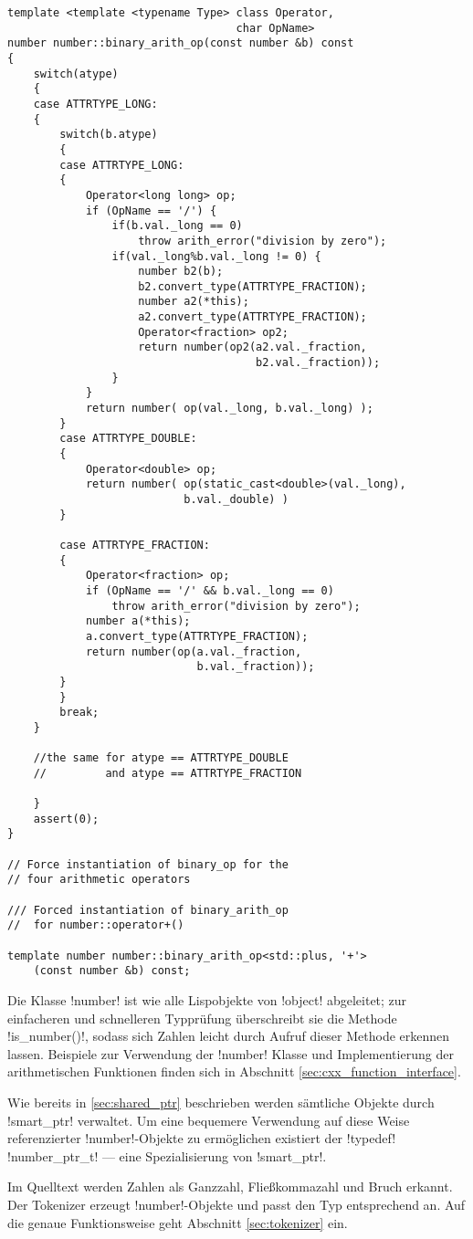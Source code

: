 \begin{lstlisting}[caption={Arithmetische Operatoren}, label=lst:op_template]
template <template <typename Type> class Operator,
                                   char OpName>
number number::binary_arith_op(const number &b) const
{
    switch(atype)
    {
    case ATTRTYPE_LONG:
    {
        switch(b.atype)
        {
        case ATTRTYPE_LONG:
        {
            Operator<long long> op;
            if (OpName == '/') {
                if(b.val._long == 0)
                    throw arith_error("division by zero");
                if(val._long%b.val._long != 0) {
                    number b2(b);
                    b2.convert_type(ATTRTYPE_FRACTION);
                    number a2(*this);
                    a2.convert_type(ATTRTYPE_FRACTION);
                    Operator<fraction> op2;
                    return number(op2(a2.val._fraction,
                                      b2.val._fraction));
                }
            }
            return number( op(val._long, b.val._long) );
        }
        case ATTRTYPE_DOUBLE:
        {
            Operator<double> op;
            return number( op(static_cast<double>(val._long),
                           b.val._double) )
        }

        case ATTRTYPE_FRACTION:
        {
            Operator<fraction> op;
            if (OpName == '/' && b.val._long == 0)
                throw arith_error("division by zero");
            number a(*this);
            a.convert_type(ATTRTYPE_FRACTION);
            return number(op(a.val._fraction,
                             b.val._fraction));
        }
        }
        break;
    }

    //the same for atype == ATTRTYPE_DOUBLE
    //         and atype == ATTRTYPE_FRACTION

    }
    assert(0);
}

// Force instantiation of binary_op for the
// four arithmetic operators

/// Forced instantiation of binary_arith_op
//  for number::operator+()

template number number::binary_arith_op<std::plus, '+'>
    (const number &b) const;
\end{lstlisting}

Die Klasse !number! ist wie alle Lispobjekte von !object! abgeleitet; zur einfacheren und schnelleren Typprüfung überschreibt sie die Methode !is_number()!, sodass sich Zahlen leicht durch Aufruf dieser Methode erkennen lassen. Beispiele zur Verwendung der !number! Klasse und Implementierung der arithmetischen Funktionen finden sich in Abschnitt \ref{sec:cxx_function_interface}.

Wie bereits in \ref{sec:shared_ptr} beschrieben werden sämtliche Objekte durch !smart_ptr! verwaltet. Um eine bequemere Verwendung auf diese Weise referenzierter !number!-Objekte zu ermöglichen existiert der !typedef! !number_ptr_t! --- eine Spezialisierung von !smart_ptr!.

Im Quelltext werden Zahlen als Ganzzahl, Fließkommazahl und Bruch erkannt. Der Tokenizer erzeugt !number!-Objekte und passt den Typ entsprechend an. Auf die genaue Funktionsweise geht Abschnitt \ref{sec:tokenizer} ein.
